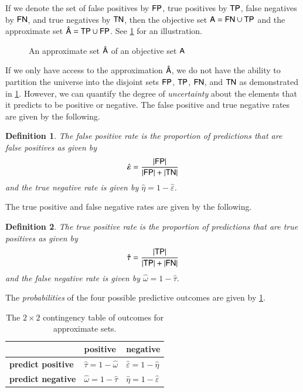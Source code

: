 \documentclass[10pt,final,hidelinks]{article}
\numberwithin{equation}{section}
\DeclarePairedDelimiter\Card{\lvert}{\rvert}
\newcommand{\tprate}{\tau}
\newcommand{\fprate}{\varepsilon}
\newcommand{\fnrate}{\omega}
\newcommand{\tnrate}{\eta}
\newcommand{\envnumstyle}{chapter}
\renewcommand{\envnumstyle}{chapter}
\renewcommand{\envnumstyle}{section}
\theoremstyle{plain}
\newtheorem{definition}{Definition}[\envnumstyle]
\begin{document}
If we denote the set of false positives by $\PlainSet{FP}$, true positives by $\PlainSet{TP}$, false negatives by $\PlainSet{FN}$, and true negatives by $\PlainSet{TN}$, then the objective set $\Set{A}=\SetUnion[\PlainSet{FN}][\Set{TP}]$ and the approximate set $\hat{\Set{A}}=\SetUnion[\PlainSet{TP}][\PlainSet{FP}]$.
See \cref{fig:ex_approx_set} for an illustration.
\begin{figure}[ht]
	\caption{An approximate set $\hat{\Set{A}}$ of an objective set $\Set{A}$}
	\label{fig:ex_approx_set}
	\centering
	\def\svgwidth{\columnwidth/4}
	
\end{figure}

If we only have access to the approximation $\hat{\Set{A}}$, we do not have the ability to partition the universe into the disjoint sets $\PlainSet{FP}$, $\PlainSet{TP}$, $\PlainSet{FN}$, and $\PlainSet{TN}$ as demonstrated in \cref{fig:ex_approx_set}.
However, we can quantify the degree of \emph{uncertainty} about the elements that it predicts to be positive or negative.
The false positive and true negative rates are given by the following.
\begin{definition}
	\label{def:fprate}
	The \emph{false positive rate} is the proportion of predictions that are \emph{false positives} as given by
	\begin{equation}
	\hat{\fprate} = \frac{\Card{\PlainSet{FP}}}{\Card{\PlainSet{FP}} + \Card{\PlainSet{TN}}}
	\end{equation}
	and the \emph{true negative rate} is given by $\hat{\tnrate} = 1 - \hat{\fprate}$.
\end{definition}
The true positive and false negative rates are given by the following.
\begin{definition}
	The \emph{true positive rate} is the proportion of predictions that are \emph{true positives} as given by
	\begin{equation}
	\hat{\tprate} = \frac{\Card{\PlainSet{TP}}}{\Card{\PlainSet{TP}} + \Card{\PlainSet{FN}}}
	\end{equation}
	and the \emph{false negative rate} is given by $\hat{\fnrate} = 1 - \hat{\tprate}$.
\end{definition}

The \emph{probabilities} of the four possible predictive outcomes are given by 
\cref{tbl:contingency_table}.
\begin{table}[ht]
	\centering
	\begin{tabular}{@{} l l l @{}}
		\toprule
		& \textbf{positive} & \textbf{negative}\\
		\midrule
		\textbf{predict positive} & $\hat{\tprate}=1-\hat{\fnrate}$ & 
		$\hat{\fprate}=1-\hat{\tnrate}$\\
		\textbf{predict negative} & $\hat{\fnrate}=1-\hat{\tprate}$ & 
		$\hat{\tnrate}=1-\hat{\fprate}$\\
		\bottomrule
	\end{tabular}
	\caption{The $2 \times 2$ contingency table of outcomes for approximate sets.}
	\label{tbl:contingency_table}        
\end{table}
%
\newcommand{\ERR}{\Delta}
\end{document}
